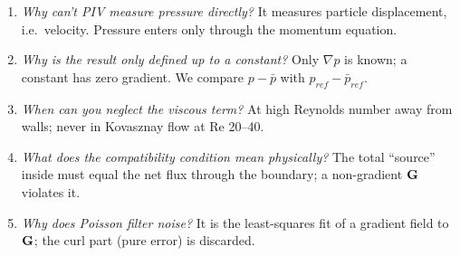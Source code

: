 \begin{viva}
\begin{enumerate}[leftmargin=*]
\item \emph{Why can't PIV measure pressure directly?} It measures particle displacement, i.e.\ velocity. Pressure enters only through the momentum equation.
\item \emph{Why is the result only defined up to a constant?} Only $\nabla p$ is known; a constant has zero gradient. We compare $p-\bar p$ with $p_{ref}-\bar p_{ref}$.
\item \emph{When can you neglect the viscous term?} At high Reynolds number away from walls; never in Kovasznay flow at Re 20--40.
\item \emph{What does the compatibility condition mean physically?} The total ``source'' inside must equal the net flux through the boundary; a non-gradient $\mathbf{G}$ violates it.
\item \emph{Why does Poisson filter noise?} It is the least-squares fit of a gradient field to $\mathbf{G}$; the curl part (pure error) is discarded.
\end{enumerate}
\end{viva}
